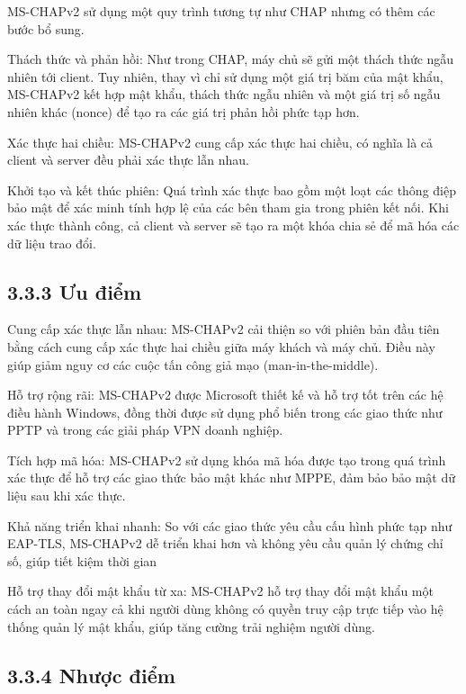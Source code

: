 MS-CHAPv2 sử dụng một quy trình tương tự như CHAP nhưng có thêm các bước bổ sung.

Thách thức và phản hồi: Như trong CHAP, máy chủ sẽ gửi một thách thức ngẫu nhiên tới client. Tuy nhiên, thay vì chỉ sử dụng một giá trị băm của mật khẩu, MS-CHAPv2 kết hợp mật khẩu, thách thức ngẫu nhiên và một giá trị số ngẫu nhiên khác (nonce) để tạo ra các giá trị phản hồi phức tạp hơn.

Xác thực hai chiều: MS-CHAPv2 cung cấp xác thực hai chiều, có nghĩa là cả client và server đều phải xác thực lẫn nhau. 

Khởi tạo và kết thúc phiên: Quá trình xác thực bao gồm một loạt các thông điệp bảo mật để xác minh tính hợp lệ của các bên tham gia trong phiên kết nối. Khi xác thực thành công, cả client và server sẽ tạo ra một khóa chia sẻ để mã hóa các dữ liệu trao đổi.

\subsection*{3.3.3 Ưu điểm}

Cung cấp xác thực lẫn nhau: MS-CHAPv2 cải thiện so với phiên bản đầu tiên bằng cách cung cấp xác thực hai chiều giữa máy khách và máy chủ. Điều này giúp giảm nguy cơ các cuộc tấn công giả mạo (man-in-the-middle).

Hỗ trợ rộng rãi: MS-CHAPv2 được Microsoft thiết kế và hỗ trợ tốt trên các hệ điều hành Windows, đồng thời được sử dụng phổ biến trong các giao thức như PPTP và trong các giải pháp VPN doanh nghiệp.

Tích hợp mã hóa: MS-CHAPv2 sử dụng khóa mã hóa được tạo trong quá trình xác thực để hỗ trợ các giao thức bảo mật khác như MPPE, đảm bảo bảo mật dữ liệu sau khi xác thực.

Khả năng triển khai nhanh: So với các giao thức yêu cầu cấu hình phức tạp như EAP-TLS, MS-CHAPv2 dễ triển khai hơn và không yêu cầu quản lý chứng chỉ số, giúp tiết kiệm thời gian

Hỗ trợ thay đổi mật khẩu từ xa: MS-CHAPv2 hỗ trợ thay đổi mật khẩu một cách an toàn ngay cả khi người dùng không có quyền truy cập trực tiếp vào hệ thống quản lý mật khẩu, giúp tăng cường trải nghiệm người dùng.

\subsection*{3.3.4 Nhược điểm}

